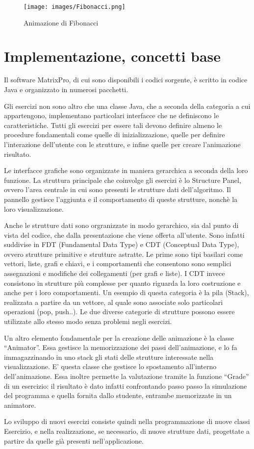 \begin{figure}[htbp]
\centering
\texttt{[image: images/Fibonacci.png]}
\caption{Animazione di Fibonacci}
\end{figure} 


\section{Implementazione, concetti base}

Il software MatrixPro, di cui sono disponibili i codici sorgente,
è scritto in codice Java e organizzato in numerosi pacchetti.

Gli esercizi non sono altro che una classe Java, che a seconda della
categoria a cui appartengono, implementano particolari interfacce
che ne definiscono le caratteristiche. Tutti gli esercizi per essere
tali devono definire almeno le procedure fondamentali come quelle
di inizializzazione, quelle per definire l'interazione dell'utente
con le strutture, e infine quelle per creare l'animazione risultato.

Le interfacce grafiche sono organizzate in maniera gerarchica a seconda
della loro funzione. La struttura principale che coinvolge gli esercizi
è lo Structure Panel, ovvero l'area centrale in cui sono presenti
le strutture dati dell'algoritmo. Il pannello gestisce l'aggiunta
e il comportamento di queste strutture, nonchè la loro visualizzazione.

Anche le strutture dati sono orgranizzate in modo gerarchico, sia
dal punto di vista del codice, che dalla presentazione che viene offerta
all'utente. Sono infatti suddivise in FDT (Fundamental Data Type)
e CDT (Conceptual Data Type), ovvero strutture primitive e strutture
astratte. Le prime sono tipi basilari come vettori, liste, grafi e
chiavi, e i comportamenti che consentono sono semplici assegnazioni
e modifiche dei collegamenti (per grafi e liste). I CDT invece consistono
in strutture più complesse per quanto riguarda la loro costruzione
e anche per i loro comportamenti. Un esempio di questa categoria è
la pila (Stack), realizzata a partire da un vettore, al quale sono
associate solo particolari operazioni (pop, push..). Le due diverse
categorie di strutture possono essere utilizzate allo stesso modo
senza problemi negli esercizi.

Un altro elemento fondamentale per la creazione delle animazione è
la classe {}``Animator''. Essa gestisce la memorizzazione dei passi
dell'animazione, e lo fa immagazzinando in uno stack gli stati delle
strutture interessate nella visualizzazione. E' questa classe che
gestisce lo spostamento all'interno dell'animazione. Essa inoltre
permette la valutazione tramite la funzione {}``Grade'' di un esercizio:
il risultato è dato infatti confrontando passo passo la simulazione
del programma e quella fornita dallo studente, entrambe memorizzate
in un animatore.

Lo sviluppo di nuovi esercizi consiste quindi nella programmazione
di nuove classi Esercizio, e nella realizzazione, se necessario, di
nuove strutture dati, progettate a partire da quelle già presenti
nell'applicazione.
